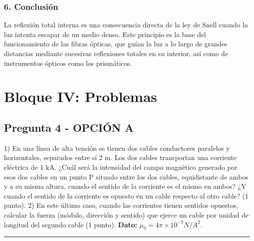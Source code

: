 \subsubsection*{6. Conclusión}
\begin{cajaconclusion}
La reflexión total interna es una consecuencia directa de la ley de Snell cuando la luz intenta escapar de un medio denso. Este principio es la base del funcionamiento de las fibras ópticas, que guían la luz a lo largo de grandes distancias mediante sucesivas reflexiones totales en su interior, así como de instrumentos ópticos como los prismáticos.
\end{cajaconclusion}

\newpage

\section{Bloque IV: Problemas}
\label{sec:em_2007_sep_ext}

\subsection{Pregunta 4 - OPCIÓN A}
\label{subsec:4A_2007_sep_ext}

\begin{cajaenunciado}
1) En una línea de alta tensión se tienen dos cables conductores paralelos y horizontales, separados entre sí 2 m. Los dos cables transportan una corriente eléctrica de 1 kA. ¿Cuál será la intensidad del campo magnético generado por esos dos cables en un punto P situado entre los dos cables, equidistante de ambos y a su misma altura, cuando el sentido de la corriente es el mismo en ambos? ¿Y cuando el sentido de la corriente es opuesto en un cable respecto al otro cable? (1 punto).
2) En este último caso, cuando las corrientes tienen sentidos opuestos, calcular la fuerza (módulo, dirección y sentido) que ejerce un cable por unidad de longitud del segundo cable (1 punto).
\textbf{Dato:} $\mu_{0}=4\pi\times10^{-7}N/A^{2}$.
\end{cajaenunciado}
\hrule

